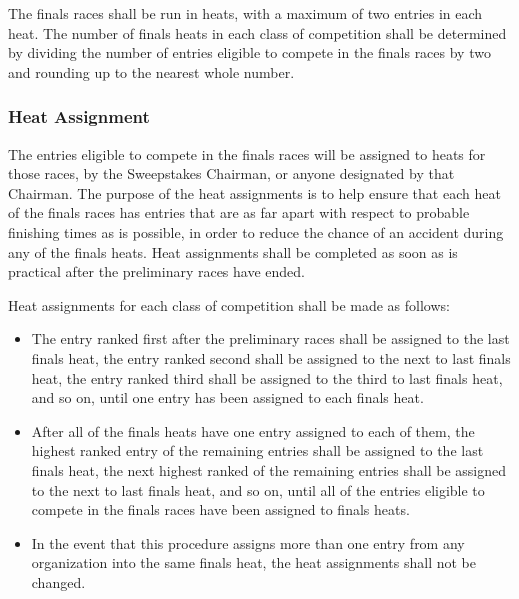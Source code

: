 	The finals races shall be run in heats, with a maximum of two entries in each heat. The number of finals heats in each class of competition shall be determined by dividing the number of entries eligible to compete in the finals races by two and rounding up to the nearest whole number.

\subsubsection{Heat Assignment}

	The entries eligible to compete in the finals races will be assigned to heats for those races, by the Sweepstakes Chairman, or anyone designated by that Chairman. The purpose of the heat assignments is to help ensure that each heat of the finals races has entries that are as far apart with respect to probable finishing times as is possible, in order to reduce the chance of an accident during any of the finals heats. Heat assignments shall be completed as soon as is practical after the preliminary races have ended.
	\newline

	\noindent Heat assignments for each class of competition shall be made as follows:

	\begin{itemize}

		\item
		The entry ranked first after the preliminary races shall be assigned to the last finals heat, the entry ranked second shall be assigned to the next to last finals heat, the entry ranked third shall be assigned to the third to last finals heat, and so on, until one entry has been assigned to each finals heat.

		\item
		After all of the finals heats have one entry assigned to each of them, the highest ranked entry of the remaining entries shall be assigned to the last finals heat, the next highest ranked of the remaining entries shall be assigned to the next to last finals heat, and so on, until all of the entries eligible to compete in the finals races have been assigned to finals heats.

		\item
		In the event that this procedure assigns more than one entry from any organization into the same finals heat, the heat assignments shall not be changed.

	\end{itemize}

